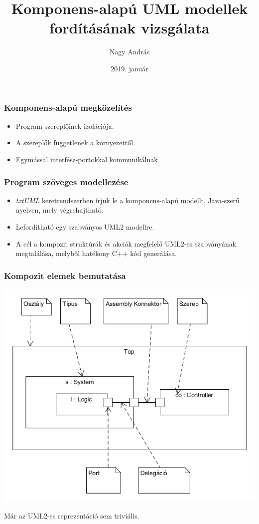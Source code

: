 \documentclass[11pt]{beamer}
\author{Nagy András}
\title{Komponens-alapú UML modellek fordításának vizsgálata}
\date{2019. január}
\begin{document}
\begin{frame}
\titlepage
\end{frame}

\begin{frame}
	\frametitle{Komponens-alapú megközelítés}
	
	\begin{itemize}
		\item Program szereplőinek izolációja.
		\item A szereplők függetlenek a környezettől.
		\item Egymással interfész-portokkal kommunikálnak
	\end{itemize}
\end{frame}

\begin{frame}[fragile]
	\frametitle{Program szöveges modellezése}
	
	\begin{itemize}
		\item \textit{txtUML} keretrendszerben írjuk le a komponens-alapú modellt, Java-szerű nyelven, mely végrehajtható.
		\item Lefordítható egy szabványos UML2 modellre.
		\item A cél a kompozit struktúrák és akciók megfelelő UML2-es szabványának megtalálása, melyből hatékony C++ kód generálása.
	\end{itemize}
	
\end{frame}


\begin{frame}[fragile]
	\frametitle{Kompozit elemek bemutatása}	
	\includegraphics[scale=0.4]{composit_stuct_ea.png}
	
	Már az UML2-es reprezentáció sem triviális.

	
\end{frame}
\end{document}
